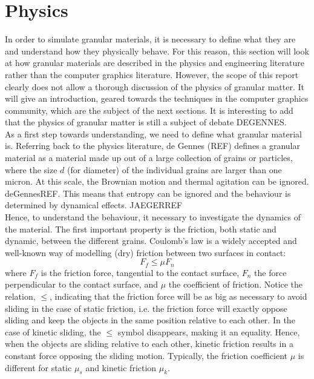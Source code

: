 \ifx\isEmbedded\undefined

\graphicspath{{../img/}}

\tableofcontents
\pagebreak

\fi

\section{Physics} \label{sec_physics}
In order to simulate granular materials, it is necessary to define what they are and understand how they physically behave. For this reason, this section will look at how granular materials are described in the physics and engineering literature rather than the computer graphics literature. However, the scope of this report clearly does not allow a thorough discussion of the physics of granular matter. It will give an introduction, geared towards the techniques in the computer graphics community, which are the subject of the next sections. It is interesting to add that the physics of granular matter is still a subject of debate DEGENNES.\\

As a first step towards understanding, we need to define what granular material is. Referring back to the physics literature, de Gennes (REF) defines a granular material as a material made up out of a large collection of grains or particles, where the size $d$ (for diameter) of the individual grains are larger than one micron. At this scale, the Brownian motion and thermal agitation can be ignored. deGennesREF. This means that entropy can be ignored and the behaviour is determined by dynamical effects. JAEGERREF\\

Hence, to understand the behaviour, it necessary to investigate the dynamics of the material. The first important property is the friction, both static and dynamic, between the different grains. Coulomb's law is a widely accepted and well-known way of modelling (dry) friction between two surfaces in contact:
\begin{equation} \label{phys_friction}
F_f \leq \mu F_n
\end{equation} 
where $F_f$ is the friction force, tangential to the contact surface, $F_n$ the force perpendicular to the contact surface, and $\mu$ the coefficient of friction. Notice the relation, $\leq$, indicating that the friction force will be as big as necessary to avoid sliding in the case of static friction, i.e. the friction force will exactly oppose sliding and keep the objects in the same position relative to each other. In the case of kinetic sliding, the $\leq$ symbol disappears, making it an equality. Hence, when the objects are sliding relative to each other, kinetic friction results in a constant force opposing the sliding motion. Typically, the friction coefficient $\mu$ is different for static $\mu_s$ and kinetic friction $\mu_k$.\\

